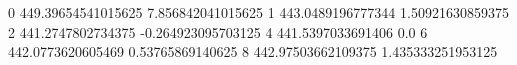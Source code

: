 0 449.39654541015625 7.856842041015625
1 443.0489196777344 1.50921630859375
2 441.2747802734375 -0.264923095703125
4 441.5397033691406 0.0
6 442.0773620605469 0.53765869140625
8 442.97503662109375 1.435333251953125
